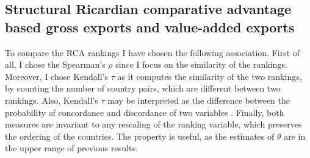 \subsection{Structural Ricardian comparative advantage based gross exports and value-added exports}
To compare the RCA rankings I have chosen the following association.
First of all, I chose the Spearman's $\rho$  since I focus on the similarity of the rankings.
Moreover, I chose Kendall's $\tau$ as it computes the similarity of the two rankings, by counting the number of country pairs, which are different between two rankings.
Also, Kendall's  $\tau$ may be interpreted as the difference between the probability of concordance and discordance of two variables \parencite{newson2parameters}.
Finally, both measures are invariant to any rescaling of the ranking variable, which preserves the ordering of the countries.
The property is useful, as the estimates of $\theta$ are in the upper range of previous results.
\par
